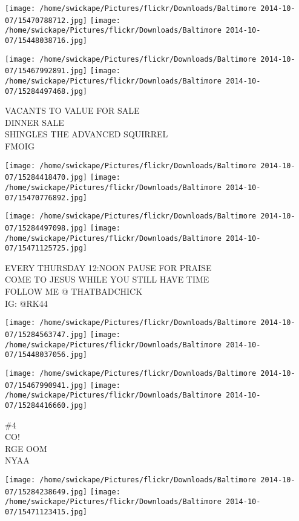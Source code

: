 \documentclass[10pt,letterpaper]{article}
\begin{document}
\texttt{[image: /home/swickape/Pictures/flickr/Downloads/Baltimore 2014-10-07/15470788712.jpg]}
\texttt{[image: /home/swickape/Pictures/flickr/Downloads/Baltimore 2014-10-07/15448038716.jpg]}

\texttt{[image: /home/swickape/Pictures/flickr/Downloads/Baltimore 2014-10-07/15467992891.jpg]}
\texttt{[image: /home/swickape/Pictures/flickr/Downloads/Baltimore 2014-10-07/15284497468.jpg]}

VACANTS TO VALUE FOR SALE\\
DINNER SALE\\
SHINGLES THE ADVANCED SQUIRREL\\
FMOIG
\pagebreak

\texttt{[image: /home/swickape/Pictures/flickr/Downloads/Baltimore 2014-10-07/15284418470.jpg]}
\texttt{[image: /home/swickape/Pictures/flickr/Downloads/Baltimore 2014-10-07/15470776892.jpg]}

\texttt{[image: /home/swickape/Pictures/flickr/Downloads/Baltimore 2014-10-07/15284497098.jpg]}
\texttt{[image: /home/swickape/Pictures/flickr/Downloads/Baltimore 2014-10-07/15471125725.jpg]}

EVERY THURSDAY 12:NOON PAUSE FOR PRAISE\\
COME TO JESUS WHILE YOU STILL HAVE TIME\\
FOLLOW ME @ THATBADCHICK\\
IG: @RK44
\pagebreak

\texttt{[image: /home/swickape/Pictures/flickr/Downloads/Baltimore 2014-10-07/15284563747.jpg]}
\texttt{[image: /home/swickape/Pictures/flickr/Downloads/Baltimore 2014-10-07/15448037056.jpg]}

\texttt{[image: /home/swickape/Pictures/flickr/Downloads/Baltimore 2014-10-07/15467990941.jpg]}
\texttt{[image: /home/swickape/Pictures/flickr/Downloads/Baltimore 2014-10-07/15284416660.jpg]}

\#4\\
CO!\\
RGE OOM\\
NYAA
\pagebreak

\texttt{[image: /home/swickape/Pictures/flickr/Downloads/Baltimore 2014-10-07/15284238649.jpg]}
\texttt{[image: /home/swickape/Pictures/flickr/Downloads/Baltimore 2014-10-07/15471123415.jpg]}
\end{document}
